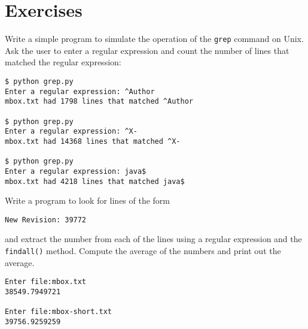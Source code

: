 \section{Exercises}

\begin{ex}
Write a simple program to simulate the operation of the {\tt grep} command 
on Unix.  Ask the user to enter a regular expression and count the number
of lines that matched the regular expression:

\beforeverb
\begin{verbatim}
$ python grep.py
Enter a regular expression: ^Author
mbox.txt had 1798 lines that matched ^Author

$ python grep.py
Enter a regular expression: ^X-
mbox.txt had 14368 lines that matched ^X-

$ python grep.py
Enter a regular expression: java$
mbox.txt had 4218 lines that matched java$
\end{verbatim}
\afterverb
%
\end{ex}

\begin{ex}
Write a program to look for lines of the form

\verb"New Revision: 39772"

and extract the number from each of the lines using a regular expression
and the {\tt findall()} method.  Compute the average of the numbers and 
print out the average.

\beforeverb
\begin{verbatim}
Enter file:mbox.txt 
38549.7949721

Enter file:mbox-short.txt
39756.9259259
\end{verbatim}
\afterverb
%

\end{ex}

